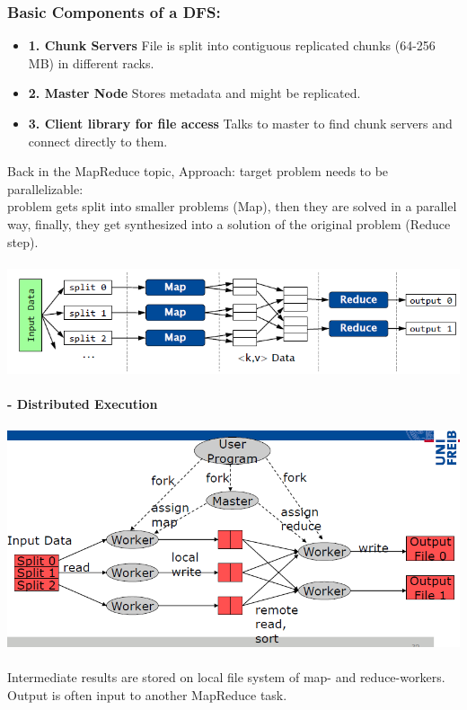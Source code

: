 \documentclass{article}
\begin{document}
\subsubsection{Basic Components of a DFS: }
\begin{itemize}
\item \textbf{1. Chunk Servers} File is split into contiguous replicated chunks (64-256 MB) in different racks.
\item \textbf{2. Master Node} Stores metadata and might be replicated.
\item \textbf{3. Client library for file access} Talks to master to find chunk servers and connect directly to them.
\end{itemize}
Back in the MapReduce topic, Approach: target problem needs to be parallelizable:\\problem gets split into smaller problems (Map), then they are solved in a parallel way, finally, they get synthesized into a solution of the original problem (Reduce step).\\\\
\includegraphics[scale=0.6]{39.png}\\\\
\textbf{- Distributed Execution}\\\\
\includegraphics[scale=0.6]{40.png}\\\\
Intermediate results are stored on local file system of map- and reduce-workers. Output is often input to another MapReduce task.\\\\
\end{document}
